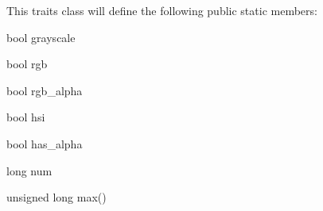 This traits class will define the following public static members:
\begin{DoxyItemize}
\item bool grayscale
\item bool rgb
\item bool rgb\_\-alpha
\item bool hsi
\end{DoxyItemize}


\begin{DoxyItemize}
\item bool has\_\-alpha
\end{DoxyItemize}


\begin{DoxyItemize}
\item long num
\item unsigned long max()
\end{DoxyItemize}


